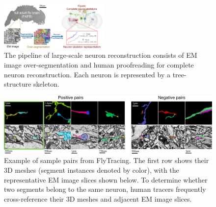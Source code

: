 \begin{figure}[htb]
    \centering
    \includegraphics[width=0.48\textwidth]{figs/data-reb.pdf}
    \caption{The pipeline of large-scale neuron reconstruction consists of EM image over-segmentation and human proofreading for complete neuron reconstruction. Each neuron is represented by a tree-structure skeleton. 
  }
    \label{fig:neuronal-data}
\end{figure}

\begin{figure}
    \centering
    \includegraphics[width=\textwidth]{figs/dataset-main.pdf}
    \caption{Example of sample pairs from FlyTracing. The first row shows their 3D meshes (segment instances denoted by color), with the representative EM image slices shown below. To determine whether two segments belong to the same neuron, human tracers frequently cross-reference their 3D meshes and adjacent EM image slices.}
    \label{dataset}
\end{figure}